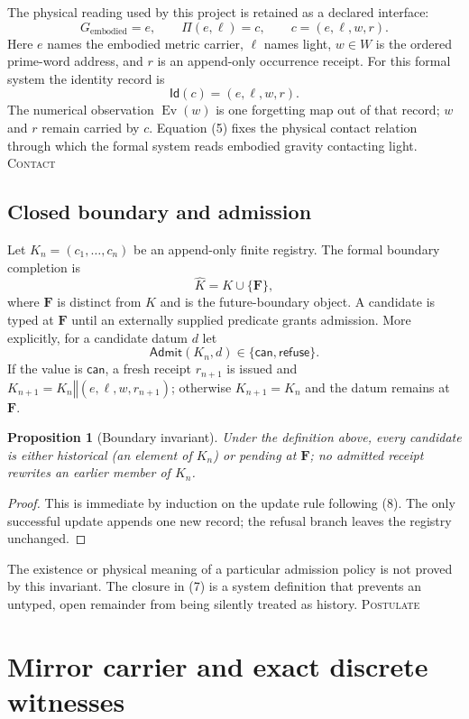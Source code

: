 \documentclass[10pt]{article}
\newtheorem{proposition}[definition]{Proposition}
\theoremstyle{remark}
\newcommand{\Ev}{\operatorname{Ev}}
\newcommand{\Admit}{\mathsf{Admit}}
\newcommand{\Id}{\mathsf{Id}}
\newcommand{\cstatus}[1]{\hfill\textsc{#1}}
\newcommand{\postulate}{\textsc{Postulate}}
\newcommand{\interface}{\textsc{Contact}}
\begin{document}
The physical reading used by this project is retained as a declared interface:
\[
 G_{\mathrm{embodied}}=e,\qquad
 \Pi(e,\ell)=c,\qquad
 c=(e,\ell,w,r).
\tag{5}
\]
Here $e$ names the embodied metric carrier, $\ell$ names light, $w\in W$ is
the ordered prime-word address, and $r$ is an append-only occurrence receipt.
For this formal system the identity record is
\[
 \Id(c)=(e,\ell,w,r).
\tag{6}
\]
The numerical observation $\Ev(w)$ is one forgetting map out of that record;
$w$ and $r$ remain carried by $c$.  Equation (5) fixes the physical contact
relation through which the formal system reads embodied gravity contacting
light. \cstatus{\interface}

\subsection{Closed boundary and admission}

Let $K_n=(c_1,\ldots,c_n)$ be an append-only finite registry.  The formal
boundary completion is
\[
 \widehat K=K\cup\{\mathbf F\},
\tag{7}
\]
where $\mathbf F$ is distinct from $K$ and is the future-boundary object.  A candidate is
typed at $\mathbf F$ until an externally supplied predicate grants admission.
More explicitly, for a candidate datum $d$ let
\[
 \Admit(K_n,d)\in\{\mathsf{can},\mathsf{refuse}\}.
\tag{8}
\]
If the value is $\mathsf{can}$, a fresh receipt $r_{n+1}$ is issued and
$K_{n+1}=K_n\mathbin{\Vert}(e,\ell,w,r_{n+1})$; otherwise $K_{n+1}=K_n$ and
the datum remains at $\mathbf F$.

\begin{proposition}[Boundary invariant]
Under the definition above, every candidate is either historical (an element
of $K_n$) or pending at $\mathbf F$; no admitted receipt rewrites an earlier
member of $K_n$.
\end{proposition}

\begin{proof}
This is immediate by induction on the update rule following (8).  The only
successful update appends one new record; the refusal branch leaves the
registry unchanged.
\end{proof}

The existence or physical meaning of a particular admission policy is not
proved by this invariant.  The closure in (7) is a system definition that
prevents an untyped, open remainder from being silently treated as history.
\cstatus{\postulate}

\section{Mirror carrier and exact discrete witnesses}
\end{document}
